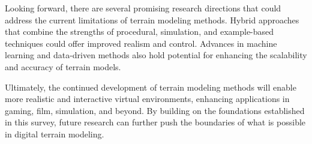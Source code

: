 \documentclass{article}
\begin{document}
Looking forward, there are several promising research directions that could address the current limitations of terrain modeling methods. Hybrid approaches that combine the strengths of procedural, simulation, and example-based techniques could offer improved realism and control. Advances in machine learning and data-driven methods also hold potential for enhancing the scalability and accuracy of terrain models.

Ultimately, the continued development of terrain modeling methods will enable more realistic and interactive virtual environments, enhancing applications in gaming, film, simulation, and beyond. By building on the foundations established in this survey, future research can further push the boundaries of what is possible in digital terrain modeling.


\printbibliography[title=References]
\end{document}
